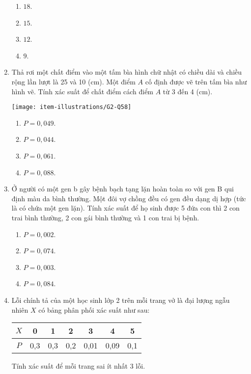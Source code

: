 \begin{enumerate}[label=\textbf{Câu \arabic*.},align=left,left=0cm..0cm,itemindent=*]
	\begin{enumerate}[label=\textbf{\Alph*.},align=left,left=1cm..0cm,itemindent=*]
		\item $18$. \item $15$. \item $12$. \item $9$.
	\end{enumerate}
	\item Thả rơi một chất điểm vào một tấm bìa hình chữ nhật có chiều dài và chiều rộng lần lượt là 25 và 10 (cm). Một điểm $A$ cố định được vẽ trên tấm bìa như hình vẽ. Tính xác suất để chất điểm cách điểm $A$ từ 3 đến 4 (cm).\par
	{\centering\texttt{[image: item-illustrations/G2-Q58]}\par}
	\begin{enumerate}[label=\textbf{\Alph*.},align=left,left=1cm..0cm,itemindent=*]
		\item $P=0,049$. \item $P=0,044$. \item $P=0,061$. \item $P=0,088$.
	\end{enumerate}
	\item Ở người có một gen b gây bệnh bạch tạng lặn hoàn toàn so với gen B qui định màu da bình thường. Một đôi vợ chồng đều có gen đều dạng dị hợp (tức là có chứa một gen lặn). Tính xác suất để họ sinh được 5 đứa con thì 2 con trai bình thường, 2 con gái bình thường và 1 con trai bị bệnh.
	\begin{enumerate}[label=\textbf{\Alph*.},align=left,left=1cm..0cm,itemindent=*]
		\item $P=0,002$. \item $P=0,074$. \item $P=0,003$. \item $P=0,084$.
	\end{enumerate}
	\item Lỗi chính tả của một học sinh lớp 2 trên mỗi trang vở là đại lượng ngẫu nhiên $X$ có bảng phân phối xác suất như sau:
	\begin{longtable}{|c|c|c|c|c|c|c|}\hline
	$X$ & 0   & 1   & 2   & 3 	& 4 	& 5   \\ \hline
	$P$ & 0,3 & 0,3 & 0,2 & 0,01 & 0,09 & 0,1 \\ \hline
	\end{longtable}
	Tính xác suất để mỗi trang sai ít nhất 3 lỗi.
	\begin{enumerate}[label=\textbf{\Alph*.},align=left,left=1cm..0cm,itemindent=*]

\end{enumerate}
\end{enumerate}
